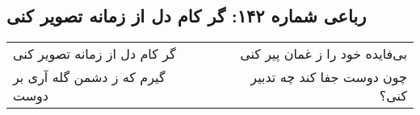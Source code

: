 \begin{center}
\section*{رباعی شماره ۱۴۲: گر کام دل از زمانه تصویر کنی}
\label{sec:142}
\begin{longtable}{l p{0.5cm} r}
گر کام دل از زمانه تصویر کنی
&&
بی‌فایده خود را ز غمان پیر کنی
\\
گیرم که ز دشمن گله آری بر دوست
&&
چون دوست جفا کند چه تدبیر کنی؟
\\
\end{longtable}
\end{center}
